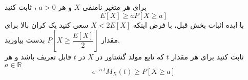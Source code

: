 \problem{}
\subproblem{}
برای هر متغیر نامنفی $X$ و هر $a > 0$ ،
ثابت کنید\\
\[E[X] \geq aP[X\geq a]\]
\subproblem{}
با ایده اثبات بخش قبل، با فرض اینکه $X<2E[X]$
سعی کنید یک کران بالا برای مقدار $P[X \geq \dfrac{E[X]}{2}]$
بدست بیاورید.\\
\subproblem{}
ثابت کنید برای هر مقدار $t$ که تابع مولد گشتاور در $X$
در $t$
قابل تعریف باشد و هر $a \in \mathbb{R}$
\[e^{-a.t}M_X(t) \geq P[X\geq a]\]\\